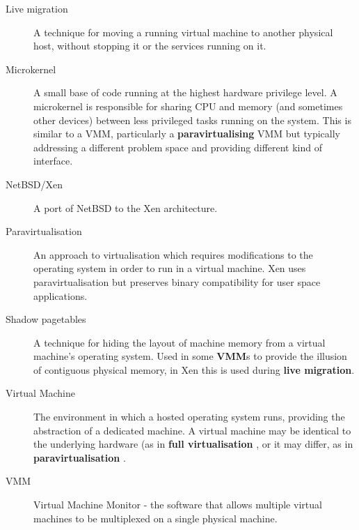 \documentclass[11pt,twoside,final,openright]{xenstyle}
\begin{document}
{\begin{description}
\item[Live migration]      A technique for moving a running virtual
                           machine to another physical host, without
			   stopping it or the services running on it.

\item[Microkernel]         A small base of code running at the highest
                           hardware privilege level.  A microkernel is
                           responsible for sharing CPU and memory (and
                           sometimes other devices) between less
                           privileged tasks running on the system.
                           This is similar to a VMM, particularly a
                           {\bf paravirtualising} VMM but typically
                           addressing a different problem space and
                           providing different kind of interface.

\item[NetBSD/Xen]          A port of NetBSD to the Xen architecture.

\item[Paravirtualisation]  An approach to virtualisation which requires
                           modifications to the operating system in
                           order to run in a virtual machine.  Xen
                           uses paravirtualisation but preserves
                           binary compatibility for user space
                           applications.

\item[Shadow pagetables]   A technique for hiding the layout of machine
                           memory from a virtual machine's operating
			   system.  Used in some {\bf VMM}s to provide
			   the illusion of contiguous physical memory,
			   in Xen this is used during
			   {\bf live migration}.

\item[Virtual Machine]     The environment in which a hosted operating
                           system runs, providing the abstraction of a
                           dedicated machine.  A virtual machine may
                           be identical to the underlying hardware (as
                           in { \bf full virtualisation }, or it may
                           differ, as in { \bf paravirtualisation }.

\item[VMM]                 Virtual Machine Monitor - the software that
                           allows multiple virtual machines to be
                           multiplexed on a single physical machine.


\end{description}}
\end{document}
